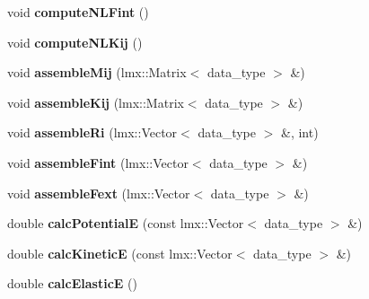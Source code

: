 \begin{CompactItemize}
\item 
\hypertarget{classmknix_1_1GaussPoint_6114329f1c2757b8a0628d88e9d82339}{
void \textbf{computeNLFint} ()}
\label{classmknix_1_1GaussPoint_6114329f1c2757b8a0628d88e9d82339}

\item 
\hypertarget{classmknix_1_1GaussPoint_2b0667914f2a511167db6049616bf188}{
void \textbf{computeNLKij} ()}
\label{classmknix_1_1GaussPoint_2b0667914f2a511167db6049616bf188}

\item 
\hypertarget{classmknix_1_1GaussPoint_62f27768cbdfa9df3c88444b0f270fcf}{
void \textbf{assembleMij} (lmx::Matrix$<$ data\_\-type $>$ \&)}
\label{classmknix_1_1GaussPoint_62f27768cbdfa9df3c88444b0f270fcf}

\item 
\hypertarget{classmknix_1_1GaussPoint_e995cf148587ed806ad440421c9c0130}{
void \textbf{assembleKij} (lmx::Matrix$<$ data\_\-type $>$ \&)}
\label{classmknix_1_1GaussPoint_e995cf148587ed806ad440421c9c0130}

\item 
\hypertarget{classmknix_1_1GaussPoint_750508df5aa985421babfed3135fe1f5}{
void \textbf{assembleRi} (lmx::Vector$<$ data\_\-type $>$ \&, int)}
\label{classmknix_1_1GaussPoint_750508df5aa985421babfed3135fe1f5}

\item 
\hypertarget{classmknix_1_1GaussPoint_f42b26bb5560437cd24a05a6ec5a12df}{
void \textbf{assembleFint} (lmx::Vector$<$ data\_\-type $>$ \&)}
\label{classmknix_1_1GaussPoint_f42b26bb5560437cd24a05a6ec5a12df}

\item 
\hypertarget{classmknix_1_1GaussPoint_95ea27055e2b71b521b5d5e500cdcc42}{
void \textbf{assembleFext} (lmx::Vector$<$ data\_\-type $>$ \&)}
\label{classmknix_1_1GaussPoint_95ea27055e2b71b521b5d5e500cdcc42}

\item 
\hypertarget{classmknix_1_1GaussPoint_8b0e8f05d6fe32c24fc5a4f5912c306b}{
double \textbf{calcPotentialE} (const lmx::Vector$<$ data\_\-type $>$ \&)}
\label{classmknix_1_1GaussPoint_8b0e8f05d6fe32c24fc5a4f5912c306b}

\item 
\hypertarget{classmknix_1_1GaussPoint_0c646ea6fd6888438b2f51ff7e3c0e9d}{
double \textbf{calcKineticE} (const lmx::Vector$<$ data\_\-type $>$ \&)}
\label{classmknix_1_1GaussPoint_0c646ea6fd6888438b2f51ff7e3c0e9d}

\item 
\hypertarget{classmknix_1_1GaussPoint_43f19e4df71c710f9150b834cb956f89}{
double \textbf{calcElasticE} ()}
\label{classmknix_1_1GaussPoint_43f19e4df71c710f9150b834cb956f89}


\end{CompactItemize}
